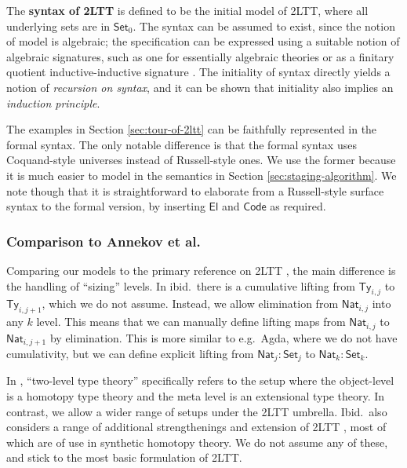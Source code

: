 \documentclass[acmsmall]{acmart}
\newcommand{\msf}[1]{\mathsf{#1}}
\newcommand{\Code}{\msf{Code}}
\newcommand{\El}{\msf{El}}
\newcommand{\Ty}{\msf{Ty}}
\newcommand{\Nat}{\msf{Nat}}
\newcommand{\Set}{\mathsf{Set}}
\theoremstyle{remark}
\begin{document}
\begin{definition}
The \textbf{syntax of 2LTT} is defined to be the initial model of 2LTT, where
all underlying sets are in $\Set_0$. The syntax can be assumed to exist, since
the notion of model is algebraic; the specification can be expressed using a
suitable notion of algebraic signatures, such as one for essentially algebraic
theories \cite{partialhorn} or as a finitary quotient inductive-inductive
signature \cite{kaposi2019constructing}. The initiality of syntax directly
yields a notion of \emph{recursion on syntax}, and it can be shown that
initiality also implies an \emph{induction principle}.
\end{definition}

The examples in Section \ref{sec:tour-of-2ltt} can be faithfully represented in
the formal syntax. The only notable difference is that the formal syntax uses
Coquand-style universes instead of Russell-style ones. We use the former because
it is much easier to model in the semantics in Section \ref{sec:staging-algorithm}. We note
though that it is straightforward to elaborate from a Russell-style surface
syntax to the formal version, by inserting $\El$ and $\Code$ as required.

\subsubsection{Comparison to Annekov et al.}
Comparing our models to the primary reference on 2LTT \cite{twolevel}, the main
difference is the handling of ``sizing'' levels. In ibid.\ there is a cumulative
lifting from $\Ty_{i,j}$ to $\Ty_{i,j+1}$, which we do not assume. Instead,
we allow elimination from $\Nat_{i,j}$ into any $k$ level. This means that we
can manually define lifting maps from $\Nat_{i,j}$ to $\Nat_{i,j+1}$ by
elimination. This is more similar to e.g.\ Agda, where we do not have cumulativity,
but we can define explicit lifting from $\Nat_j : \Set_j$ to $\Nat_k : \Set_k$.

In \cite{twolevel}, ``two-level type theory'' specifically refers to the setup
where the object-level is a homotopy type theory and the meta level is an
extensional type theory. In contrast, we allow a wider range of setups under the
2LTT umbrella. Ibid.\ also considers a range of additional
strengthenings and extension of 2LTT \cite[Section~2.4]{twolevel}, most of which
are of use in synthetic homotopy theory. We do not assume any of these, and
stick to the most basic formulation of 2LTT.
\end{document}
